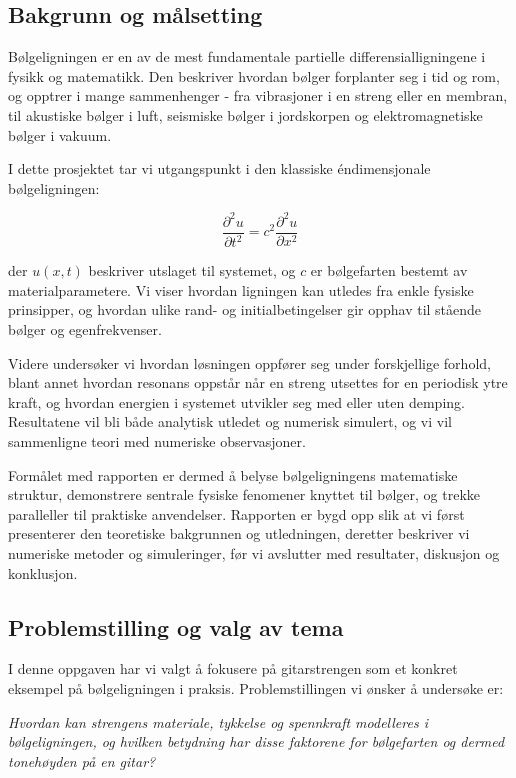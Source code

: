 \subsection{Bakgrunn og målsetting}
Bølgeligningen er en av de mest fundamentale partielle differensialligningene i fysikk og matematikk. 
Den beskriver hvordan bølger forplanter seg i tid og rom, og opptrer i mange sammenhenger - fra 
vibrasjoner i en streng eller en membran, til akustiske bølger i luft, seismiske bølger i jordskorpen 
og elektromagnetiske bølger i vakuum. 

I dette prosjektet tar vi utgangspunkt i den klassiske éndimensjonale bølgeligningen:

\begin{equation*}
    \frac{\partial^2 u}{\partial t^2} = c^2 \frac{\partial^2 u}{\partial x^2}
    \label{eq:bølgeligningen}
\end{equation*}

der $u(x,t)$ beskriver utslaget til systemet, og $c$ er bølgefarten bestemt av materialparametere. 
Vi viser hvordan ligningen kan utledes fra enkle fysiske prinsipper, og hvordan ulike rand- og 
initialbetingelser gir opphav til stående bølger og egenfrekvenser. 

Videre undersøker vi hvordan løsningen oppfører seg under forskjellige forhold, blant annet hvordan 
resonans oppstår når en streng utsettes for en periodisk ytre kraft, og hvordan energien i systemet 
utvikler seg med eller uten demping. Resultatene vil bli både analytisk utledet og numerisk simulert, 
og vi vil sammenligne teori med numeriske observasjoner. 

Formålet med rapporten er dermed å belyse bølgeligningens matematiske struktur, demonstrere sentrale 
fysiske fenomener knyttet til bølger, og trekke paralleller til praktiske anvendelser. Rapporten er 
bygd opp slik at vi først presenterer den teoretiske bakgrunnen og utledningen, deretter beskriver vi 
numeriske metoder og simuleringer, før vi avslutter med resultater, diskusjon og konklusjon.

\subsection{Problemstilling og valg av tema}

I denne oppgaven har vi valgt å fokusere på gitarstrengen som et konkret eksempel på
bølgeligningen i praksis. Problemstillingen vi ønsker å undersøke er:

\begin{center}
    \textit{Hvordan kan strengens materiale, tykkelse og spennkraft modelleres i bølgeligningen, 
    og hvilken betydning har disse faktorene for bølgefarten og dermed tonehøyden på en gitar?}
\end{center}

